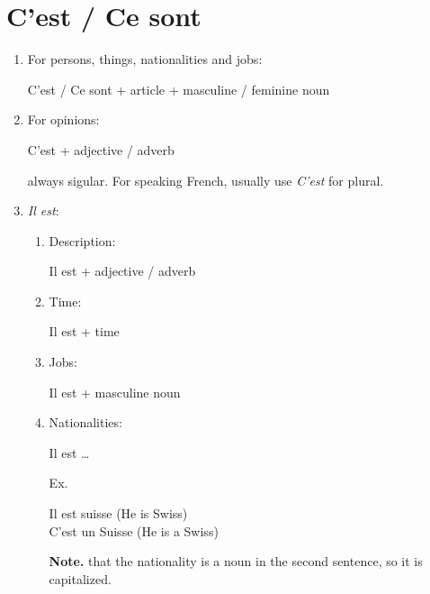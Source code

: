 \documentclass{book}
\begin{document}
    \section{C'est / Ce sont}
        \begin{enumerate}
            \item For persons, things, nationalities and jobs:
                \begin{center}
                    C'est / Ce sont + article + masculine / feminine noun
                \end{center}
            \item For opinions:
                \begin{center}
                    C'est + adjective / adverb 
                \end{center}
                always sigular. For speaking French, usually use \textit{C'est} for plural.
            \item \textit{Il est}:
                \begin{enumerate}
                    \item Description: 
                        \begin{center}
                            Il est  + adjective / adverb
                        \end{center}
                    \item Time:
                        \begin{center}
                            Il est + time
                        \end{center}
                    \item Jobs:
                        \begin{center}
                            Il est + masculine noun
                        \end{center}
                    \item Nationalities:
                        \begin{center}
                            Il est \dots
                        \end{center}
                        Ex. 
                        \begin{center}
                            Il est suisse (He is Swiss) \\
                            C'est un Suisse (He is a Swiss)
                        \end{center}
                        \textbf{Note.} that the nationality is a noun in the second sentence, so it is capitalized.
                \end{enumerate}
        \end{enumerate}
\end{document}
